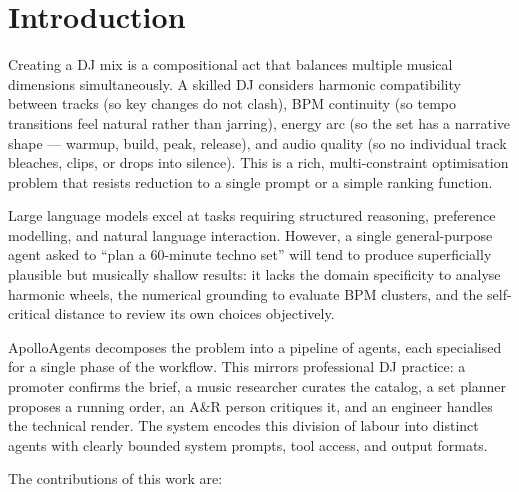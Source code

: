 \documentclass[11pt,a4paper]{article}
\begin{document}
\section{Introduction}

Creating a DJ mix is a compositional act that balances multiple musical
dimensions simultaneously. A skilled DJ considers harmonic compatibility
between tracks (so key changes do not clash), BPM continuity (so tempo
transitions feel natural rather than jarring), energy arc (so the set has a
narrative shape --- warmup, build, peak, release), and audio quality (so no
individual track bleaches, clips, or drops into silence). This is a rich,
multi-constraint optimisation problem that resists reduction to a single
prompt or a simple ranking function.

Large language models excel at tasks requiring structured reasoning,
preference modelling, and natural language interaction. However, a single
general-purpose agent asked to ``plan a 60-minute techno set'' will tend to
produce superficially plausible but musically shallow results: it lacks the
domain specificity to analyse harmonic wheels, the numerical grounding to
evaluate BPM clusters, and the self-critical distance to review its own
choices objectively.

ApolloAgents decomposes the problem into a pipeline of agents, each
specialised for a single phase of the workflow. This mirrors professional DJ
practice: a promoter confirms the brief, a music researcher curates the
catalog, a set planner proposes a running order, an A\&R person critiques it,
and an engineer handles the technical render. The system encodes this division
of labour into distinct agents with clearly bounded system prompts, tool
access, and output formats.

\medskip
The contributions of this work are:
\end{document}
